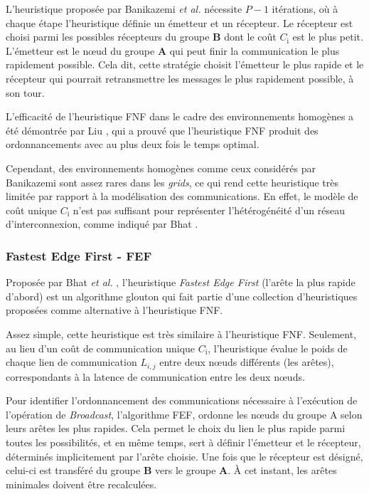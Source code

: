 L'heuristique proposée par Banikazemi \emph{et al.} nécessite $P-1$
itérations, où à chaque étape l'heuristique définie un émetteur et
un récepteur. Le récepteur est choisi parmi les possibles récepteurs
du groupe \textbf{B} dont le coût \emph{$C_{\textrm{i}}$} est le
plus petit. L'émetteur est le n{\oe}ud du groupe \textbf{A} qui peut
finir la communication le plus rapidement possible. Cela dit, cette
stratégie choisit l'émetteur le plus rapide et le récepteur qui pourrait
retransmettre les messages le plus rapidement possible, à son tour.

L'efficacité de l'heuristique FNF dans le cadre des environnements
homogènes a été démontrée par Liu \cite{PangfengLiu00b}, qui a prouvé que
l'heuristique FNF produit des ordonnancements avec au plus deux fois
le temps optimal.

Cependant, des environnements homogènes comme ceux considérés par
Banikazemi sont assez rares dans les \textit{grids}, ce qui rend cette heuristique
très limitée par rapport à la modélisation des communications. En
effet, le modèle de coût unique $C_{\textrm{i}}$ n'est pas suffisant
pour représenter l'hétérogénéité d'un réseau d'interconnexion, comme
indiqué par Bhat \cite{Bhat03}. 


\subsubsection*{Fastest Edge First - FEF}

Proposée par Bhat \emph{et al.} \cite{Bhat03}, l'heuristique \emph{Fastest
	Edge First} (l'arête la plus rapide d'abord) est un algorithme glouton
qui fait partie d'une collection d'heuristiques proposées comme alternative
à l'heuristique FNF. 

Assez simple, cette heuristique est très similaire à l'heuristique
FNF. Seulement, au lieu d'un coût de communication unique $C_{\textrm{i}}$,
l'heuristique évalue le poids de chaque lien de communication $L_{i,j}$
entre deux n{\oe}uds différents (les arêtes), correspondants à la latence
de communication entre les deux n{\oe}uds. 

Pour identifier l'ordonnancement des communications nécessaire à l'exécution
de l'opération de \textit{Broadcast}, l'algorithme FEF, ordonne les n{\oe}uds
du groupe A selon leurs arêtes les plus rapides. Cela permet le choix
du lien le plus rapide parmi toutes les possibilités, et en même temps,
sert à définir l'émetteur et le récepteur, déterminés implicitement
par l'arête choisie. Une fois que le récepteur est désigné, celui-ci
est transféré du groupe \textbf{B} vers le groupe \textbf{A}. À cet
instant, les arêtes minimales doivent être recalculées.

